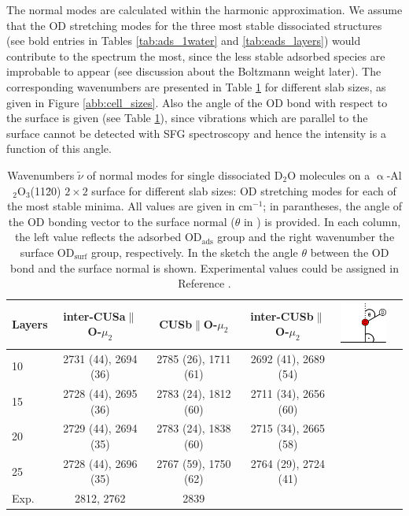 \documentclass[11pt,DIV=13,BCOR=5mm,a4paper,headinclude]{scrbook}
\begin{document}
The normal modes are calculated within the harmonic approximation.
We assume that the OD stretching modes for the three most stable dissociated structures (see bold entries in Tables \ref{tab:ads_1water} and \ref{tab:eads_layers}) would contribute to the spectrum the most, since the less stable adsorbed species are improbable to appear (see discussion about the Boltzmann weight later).
The corresponding wavenumbers are presented in Table \ref{tab:freq_layers} for different slab sizes, as given in Figure \ref{abb:cell_sizes}.
Also the angle of the OD bond with respect to the surface is given (see Table \ref{tab:freq_layers}), since vibrations which are parallel to the surface cannot be detected with SFG spectroscopy and hence the intensity is a function of this angle.
\begin{table}[th]
  \centering
 \caption{Wavenumbers $\tilde{\nu}$ of normal modes for single dissociated D$_2$O molecules on a $\upalpha$-Al$_2$O$_3$(11\=20) $2\times 2$ surface for different slab sizes: OD stretching modes for each of the most stable minima.
All values are given in cm$^{-1}$; in parantheses, the angle of the OD bonding vector to the surface normal ($\theta$ in \textdegree) is provided.
In each column, the left value reflects the adsorbed OD$_\textrm{ads}$ group and the right wavenumber the surface OD$_\textrm{surf}$ group, respectively.
 In the sketch the angle $\theta$ between the OD bond and the surface normal is shown.
 Experimental values could be assigned in Reference \cite{Heiden11-20_2018}.}
\vspace*{.2cm} 
 \begin{tabular}{l|ccccc}
 \toprule
  Layers&inter-CUSa$\parallel$O-$\mu_2$ &CUSb$\parallel$O-$\mu_2$  &inter-CUSb$\parallel$O-$\mu_2$&\multirow{6}{1pt}{\includegraphics[width=2cm]{figures/11-20/ODangle.png}} \\\midrule
  10 &2731 (44), 2694 (36) &2785 (26), 1711 (61) &2692 (41), 2689 (54)& \\
  15 &2728 (44), 2695 (36) &2783 (24), 1812 (60) &2711 (34), 2656 (60)& \\
  20 &2729 (44), 2694 (35) &2783 (24), 1838 (60) &2715 (34), 2665 (58)& \\
  25 &2728 (44), 2696 (35) &2767 (59), 1750 (62) &2764 (29), 2724 (41)& \\\midrule
  Exp.\cite{Heiden11-20_2018} &2812, 2762& 2839 & \\\bottomrule
  \end{tabular} 
  \label{tab:freq_layers}
\end{table}
\\\\
\end{document}
